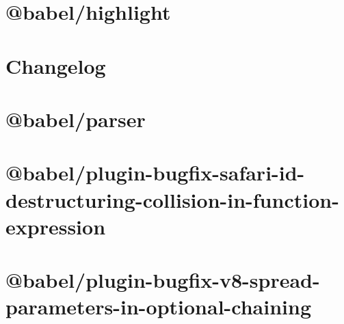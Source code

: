 \documentclass[twoside]{book}
\newcommand{\+}{\discretionary{\mbox{\scriptsize$\hookleftarrow$}}{}{}}
\begin{document}
\chapter{@babel/highlight}
\label{md__c___users_vaishnavi_jadhav__desktop__developer_code_mean_stack_example_client_node_modules__babel_highlight__r_e_a_d_m_e}

\chapter{Changelog}
\label{md__c___users_vaishnavi_jadhav__desktop__developer_code_mean_stack_example_client_node_modules__babel_parser__c_h_a_n_g_e_l_o_g}

\chapter{@babel/parser}
\label{md__c___users_vaishnavi_jadhav__desktop__developer_code_mean_stack_example_client_node_modules__babel_parser__r_e_a_d_m_e}

\chapter{@babel/plugin-\/bugfix-\/safari-\/id-\/destructuring-\/collision-\/in-\/function-\/expression}
\label{md__c___users_vaishnavi_jadhav__desktop__developer_code_mean_stack_example_client_node_modules__fbd01b626c6f93d38ed80091107c886c}

\chapter{@babel/plugin-\/bugfix-\/v8-\/spread-\/parameters-\/in-\/optional-\/chaining}
\label{md__c___users_vaishnavi_jadhav__desktop__developer_code_mean_stack_example_client_node_modules__d68c8646ff99b2878b3120dab2c56999}

\end{document}
